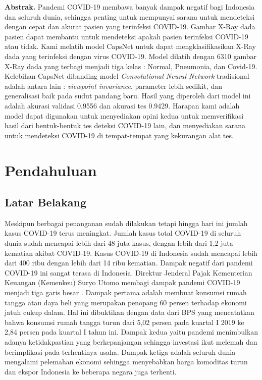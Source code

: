 \documentclass{article}
\begin{document}
  \newpage
  \textbf{Abstrak.} Pandemi COVID-19 membawa banyak dampak negatif bagi Indonesia dan seluruh dunia, sehingga penting untuk mempunyai sarana untuk mendeteksi dengan cepat dan akurat pasien yang terinfeksi COVID-19. Gambar X-Ray dada pasien dapat membantu untuk mendeteksi apakah pasien terinfeksi COVID-19 atau tidak. Kami melatih model CapsNet untuk dapat mengklasifikasikan X-Ray dada yang terinfeksi dengan virus COVID-19. Model dilatih dengan 6310 gambar X-Ray dada yang terbagi menjadi tiga kelas : Normal, Pneumonia, dan Covid-19. Kelebihan CapsNet dibanding model \textit{Convolutional Neural Network} tradisional adalah antara lain : \textit{viewpoint invariance}, parameter lebih sedikit, dan generalisasi baik pada sudut pandang baru. Hasil yang diperoleh dari model ini adalah akurasi validasi 0.9556 dan akurasi tes 0.9429. Harapan kami adalah model dapat digunakan untuk menyediakan opini kedua untuk memverifikasi hasil dari bentuk-bentuk tes deteksi COVID-19 lain, dan menyediakan sarana untuk mendeteksi COVID-19 di tempat-tempat yang kekurangan alat tes.
  \newpage
  \tableofcontents
  \newpage
  \section{Pendahuluan}
  	\subsection{Latar Belakang}
	  	Meskipun berbagai penanganan sudah dilakukan tetapi hingga hari ini jumlah kasus COVID-19 terus meningkat. Jumlah kasus total COVID-19 di seluruh dunia sudah mencapai lebih dari 48 juta kasus, dengan lebih dari 1,2 juta kematian akibat COVID-19. Kasus COVID-19 di Indonesia sudah mencapai lebih dari 400 ribu dengan lebih dari 14 ribu kematian. Dampak negatif dari pandemi COVID-19 ini sangat terasa di Indonesia. Direktur Jenderal Pajak Kementerian Keuangan (Kemenkeu) Suryo Utomo membagi dampak pandemi COVID-19 menjadi tiga garis besar \cite{zuraya}. Dampak pertama adalah membuat konsumsi rumah tangga atau daya beli yang merupakan penopang 60 persen terhadap ekonomi jatuh cukup dalam. Hal ini dibuktikan dengan data dari BPS yang mencatatkan bahwa konsumsi rumah tangga turun dari 5,02 persen pada kuartal I 2019 ke 2,84 persen pada kuartal I tahun ini. Dampak kedua yaitu pandemi menimbulkan adanya ketidakpastian yang berkepanjangan sehingga investasi ikut melemah dan berimplikasi pada terhentinya usaha. Dampak ketiga adalah seluruh dunia mengalami pelemahan ekonomi sehingga menyebabkan harga komoditas turun dan ekspor Indonesia ke beberapa negara juga terhenti.
	  	
\end{document}
